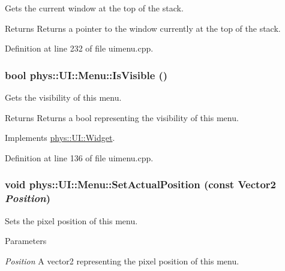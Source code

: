 Gets the current window at the top of the stack. 

\begin{DoxyReturn}{Returns}
Returns a pointer to the window currently at the top of the stack. 
\end{DoxyReturn}


Definition at line 232 of file uimenu.cpp.

\hypertarget{classphys_1_1UI_1_1Menu_ae23321617d7e14448e2fab3b455c3dc7}{
\subsubsection[{IsVisible}]{\setlength{\rightskip}{0pt plus 5cm}bool phys::UI::Menu::IsVisible ()}}
\label{d6/dd3/classphys_1_1UI_1_1Menu_ae23321617d7e14448e2fab3b455c3dc7}


Gets the visibility of this menu. 

\begin{DoxyReturn}{Returns}
Returns a bool representing the visibility of this menu. 
\end{DoxyReturn}


Implements \hyperlink{classphys_1_1UI_1_1Widget_aaf1a1bd31b8e626467ce9cdb69bdf7ac}{phys::UI::Widget}.



Definition at line 136 of file uimenu.cpp.

\hypertarget{classphys_1_1UI_1_1Menu_a18161cae59d7a8be52a2d77e27e0c5a1}{
\subsubsection[{SetActualPosition}]{\setlength{\rightskip}{0pt plus 5cm}void phys::UI::Menu::SetActualPosition (const {\bf Vector2} {\em Position})}}
\label{d6/dd3/classphys_1_1UI_1_1Menu_a18161cae59d7a8be52a2d77e27e0c5a1}


Sets the pixel position of this menu. 


\begin{DoxyParams}{Parameters}
\item[{\em Position}]A vector2 representing the pixel position of this menu. \end{DoxyParams}


